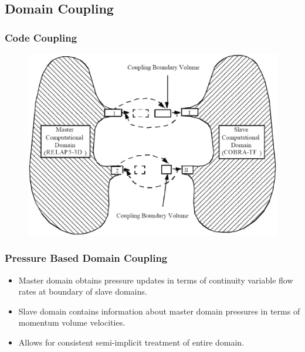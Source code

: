 \documentclass[compress,xcolor=table]{beamer}
\begin{document}
\subsection[Domain Coupling]{Domain Coupling}
\begin{frame}
\frametitle{Code Coupling}

\begin{figure}[h!t]
\centering
\includegraphics[width=.94\textwidth]{images/coupled_domains.eps}
\end{figure}

\end{frame}
\begin{frame}
\frametitle{Pressure Based Domain Coupling}

\begin{itemize}
\item{Master domain obtains pressure updates in terms of continuity variable flow rates at boundary of slave domains.}
\item{Slave domain contains information about master domain pressures in terms of momentum volume velocities.}
\item{Allows for consistent semi-implicit treatment of entire domain.}
\end{itemize}

\end{frame}
\end{document}
